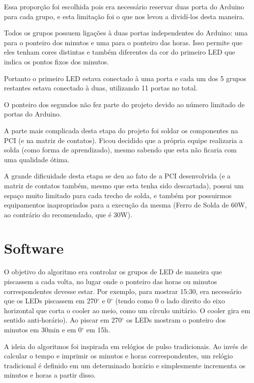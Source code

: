Essa proporção foi escolhida pois era necessário reservar duas porta do Arduino para cada grupo, e esta limitação foi o que nos levou a dividí-los desta maneira.

Todos os grupos possuem ligações à duas portas independentes do Arduino: uma para o ponteiro dos minutos e uma para o ponteiro das horas. Isso permite que eles tenham cores distintas e também diferentes da cor do primeiro LED que indica os pontos fixos dos minutos.

Portanto o primeiro LED estava conectado à uma porta e cada um dos 5 grupos restantes estava conectado à duas, utilizando 11 portas no total.

O ponteiro dos segundos não fez parte do projeto devido ao número limitado de portas do Arduino.

A parte mais complicada desta etapa do projeto foi soldar os componentes na PCI (e na matriz de contatos). Ficou decidido que a própria equipe realizaria a solda (como forma de aprendizado), mesmo sabendo que esta não ficaria com uma qualidade ótima.

A grande dificuidade desta etapa se deu ao fato de a PCI desenvolvida (e a matriz de contatos também, mesmo que esta tenha sido descartada), possui um espaço muito limitado para cada trecho de solda, e também por possuirmos equipamentos inapropriados para a execução da mesma (Ferro de Solda de 60W, ao contrário do recomendado, que é 30W).

\section{Software}

O objetivo do algoritmo era controlar os grupos de LED de maneira que piscassem a cada volta, no lugar onde o ponteiro das horas ou minutos correspondentes devesse estar. Por exemplo, para mostrar 15:30, era necessário que os LEDs piscassem em 270$^\circ$ e 0$^\circ$ (tendo como 0 o lado direito do eixo horizontal que corta o cooler ao meio, como um círculo unitário. O cooler gira em sentido anti-horário). Ao piscar em 270$^\circ$ os LEDs mostram o ponteiro dos minutos em 30min e em 0$^\circ$ em 15h.

A ideia do algoritmos foi inspirada em relógios de pulso tradicionais. Ao invés de calcular o tempo e imprimir os minutos e horas correspondentes, um relógio tradicional é definido em um determinado horário e simplesmente incrementa os minutos e horas a partir disso.

